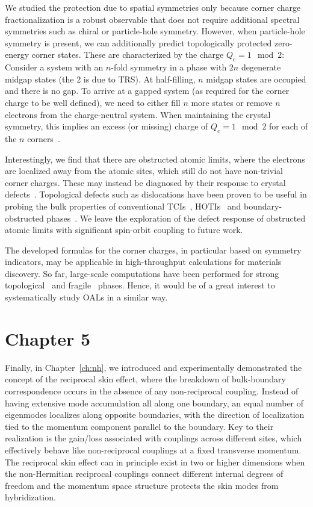 We studied the protection due to spatial symmetries only because corner charge fractionalization is a robust observable that does not require additional spectral symmetries such as chiral or particle-hole symmetry. However, when particle-hole symmetry is present, we can additionally predict topologically protected zero-energy corner states. These are characterized by the charge $Q_\mathrm{c} = 1 \mod 2$: Consider a system with an $n$-fold symmetry in a phase with $2n$ degenerate midgap states (the 2 is due to TRS). At half-filling, $n$ midgap states are occupied and there is no gap. To arrive at a gapped system (as required for the corner charge to be well defined), we need to either fill $n$ more states or remove $n$ electrons from the charge-neutral system. When maintaining the crystal symmetry, this implies an excess (or missing) charge of $Q_\mathrm{c} = 1 \mod 2$ for each of the $n$ corners~\cite{benalcazar2018quantization}.

Interestingly, we find that there are obstructed atomic limits, where the electrons are localized away from the atomic sites, which still do not have non-trivial corner charges. These may instead be diagnosed by their response to crystal defects~\cite{benalcazar2018quantization,li2019fractional}. Topological defects such as dislocations have been proven to be useful in probing the bulk properties of conventional TCIs~\cite{geier2020bulkboundarydefect}, HOTIs~\cite{PhysRevLett.123.266802, roy2020dislocation} and boundary-obstructed phases~\cite{tiwari2020chiral}. We leave the exploration of the defect response of obstructed atomic limits with significant spin-orbit coupling to future work. 

The developed formulas for the corner charges, in particular based on symmetry indicators, may be applicable in high-throughput calculations for materials discovery. So far, large-scale computations have been performed for strong topological~\cite{Vergniory2019, Tangeaau8725, Tang2019, PhysRevMaterials.3.024005} and fragile~\cite{MaiaFragile3} phases. Hence, it would be of a great interest to systematically study OALs in a similar way.

\section*{Chapter 5}
\noindent Finally, in Chapter~\ref{ch:nh}, we introduced and experimentally demonstrated the concept of the reciprocal skin effect, where the breakdown of bulk-boundary correspondence occurs in the absence of any non-reciprocal coupling. Instead of having extensive mode accumulation all along one boundary, an equal number of eigenmodes localizes along opposite boundaries, with the direction of localization tied to the momentum component parallel to the boundary. Key to their realization is the gain/loss associated with couplings across different sites, which effectively behave like non-reciprocal couplings at a fixed transverse momentum. The reciprocal skin effect can in principle exist in two or higher dimensions when the non-Hermitian reciprocal couplings connect different internal degrees of freedom and the momentum space structure protects the skin modes from hybridization.


